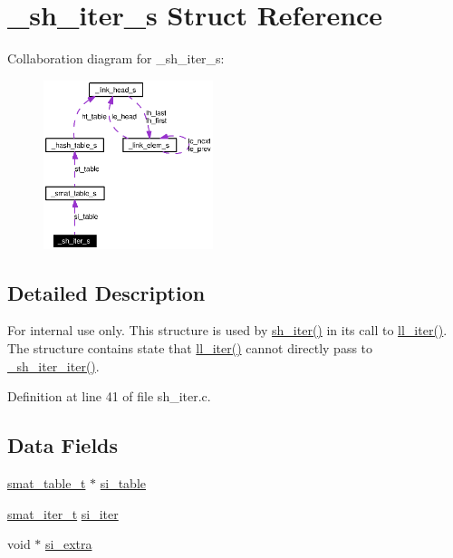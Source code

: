 \hypertarget{struct__sh__iter__s}{
\section{\_\-sh\_\-iter\_\-s Struct Reference}
\label{struct__sh__iter__s}
}
Collaboration diagram for \_\-sh\_\-iter\_\-s:\begin{figure}[H]
\begin{center}
\leavevmode
\includegraphics[width=140pt]{struct__sh__iter__s__coll__graph}
\end{center}
\end{figure}


\subsection{Detailed Description}
\begin{Desc}
\item[For internal use only.]
This structure is used by \hyperlink{group__dbprim__smat_ga23}{sh\_\-iter()} in its call to \hyperlink{group__dbprim__link_ga10}{ll\_\-iter()}. The structure contains state that \hyperlink{group__dbprim__link_ga10}{ll\_\-iter()} cannot directly pass to \hyperlink{group__dbprim__smat_ga29}{\_\-sh\_\-iter\_\-iter()}.\end{Desc}




Definition at line 41 of file sh\_\-iter.c.\subsection*{Data Fields}
\begin{CompactItemize}
\item 
\hyperlink{struct__smat__table__s}{smat\_\-table\_\-t} $\ast$ \hyperlink{struct__sh__iter__s_o0}{si\_\-table}
\item 
\hyperlink{group__dbprim__smat_ga4}{smat\_\-iter\_\-t} \hyperlink{struct__sh__iter__s_o1}{si\_\-iter}
\item 
void $\ast$ \hyperlink{struct__sh__iter__s_o2}{si\_\-extra}
\end{CompactItemize}


